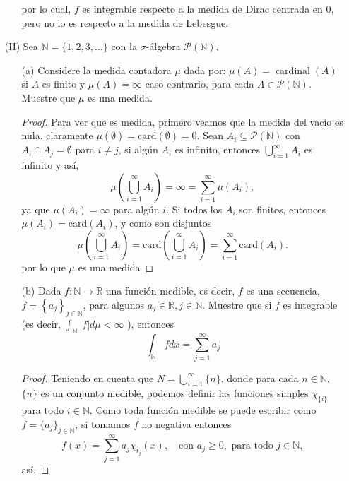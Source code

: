 \begin{itemize}
\begin{itemize}
\begin{sol}
por lo cual, $f$ es integrable respecto a la medida de Dirac centrada en 0, pero no lo es respecto a la medida de Lebesgue.
\end{sol}

\end{itemize}
\item[(II)] Sea $\mathbb{N}=\{1,2,3, \ldots\}$ con la $\sigma$-álgebra $\mathcal{P}(\mathbb{N})$.
\begin{itemize}
  

\item[(a)] Considere la medida contadora $\mu$ dada por: $\mu(A)=\operatorname{cardinal}(A)$ si $A$ es finito y $\mu(A)=\infty$ caso contrario, para cada $A \in \mathcal{P}(\mathbb{N})$. Muestre que $\mu$ es una medida.
\begin{proof}
Para ver que es medida, primero veamos que la medida del vacío es nula, claramente $\mu(\emptyset) = \text{card}(\emptyset) = 0.$ Sean \( A_i \subseteq \mathcal{P}(\mathbb{N}) \) con \( A_i \cap A_j = \emptyset \) para \( i \neq j \), si algún \( A_i \) es infinito, entonces \( \bigcup_{i=1}^{\infty} A_i \) es infinito y así,
\[ \mu\left(\bigcup_{i=1}^{\infty} A_i\right) = \infty = \sum_{i=1}^{\infty} \mu(A_i), \]
ya que \( \mu(A_i) = \infty \) para algún \( i \). Si  todos los \( A_i \) son finitos, entonces \( \mu(A_i) = \text{card}(A_i) \), y como son disjuntos
\[ \mu\left(\bigcup_{i=1}^{\infty} A_i\right) = \text{card}\left(\bigcup_{i=1}^{\infty} A_i\right) = \sum_{i=1}^{\infty} \text{card}(A_i). \]  
por lo que $\mu$ es una medida        
\end{proof}
                

\item[(b)] Dada $f: \mathbb{N} \rightarrow \mathbb{R}$ una función medible, es decir, $f$ es una secuencia, $f=\left\{a_j\right\}_{j \in \mathbb{N}}$, para algunos $a_j \in \mathbb{R}, j \in \mathbb{N}$. Muestre que si $f$ es integrable (es decir, $\int_{\mathbb{N}}|f| d \mu<\infty$ ), entonces
$$
\int_{\mathbb{N}} f d x=\sum_{j=1}^{\infty} a_j
$$
\begin{proof}

Teniendo en cuenta que \( N = \bigcup^{\infty}_{i=1} \{n\} \), donde para cada \( n \in \mathbb{N} \), \( \{n\} \) es un conjunto medible, podemos definir las funciones simples \( \chi_{\{i\}} \) para todo \( i \in \mathbb{N} \). Como toda función medible se puede escribir como \( f = \{a_j\}_{j \in \mathbb{N}} \), si tomamos \( f \) no negativa entonces
\[
f(x) = \sum_{j=1}^{\infty} a_j \chi_{i_j}(x), \quad \text{con } a_j \geq 0, \text{ para todo } j \in \mathbb{N},
\]
así,


\end{proof}
\end{itemize}
\end{itemize}
